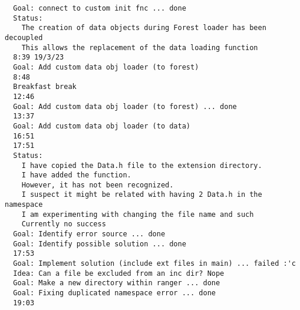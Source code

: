 \documentclass[12pt,oneside]{book}
\begin{document}
\begin{lstlisting}
  Goal: connect to custom init fnc ... done
  Status:
    The creation of data objects during Forest loader has been decoupled
    This allows the replacement of the data loading function
  8:39 19/3/23
  Goal: Add custom data obj loader (to forest)
  8:48
  Breakfast break
  12:46
  Goal: Add custom data obj loader (to forest) ... done
  13:37
  Goal: Add custom data obj loader (to data)
  16:51
  17:51
  Status:
    I have copied the Data.h file to the extension directory.
    I have added the function.
    However, it has not been recognized.
    I suspect it might be related with having 2 Data.h in the namespace
    I am experimenting with changing the file name and such
    Currently no success
  Goal: Identify error source ... done
  Goal: Identify possible solution ... done
  17:53
  Goal: Implement solution (include ext files in main) ... failed :'c
  Idea: Can a file be excluded from an inc dir? Nope
  Goal: Make a new directory within ranger ... done
  Goal: Fixing duplicated namespace error ... done
  19:03
  
\end{lstlisting}

  \printbibliography[title={Bibliografía},heading=bibintoc]
\end{document}
